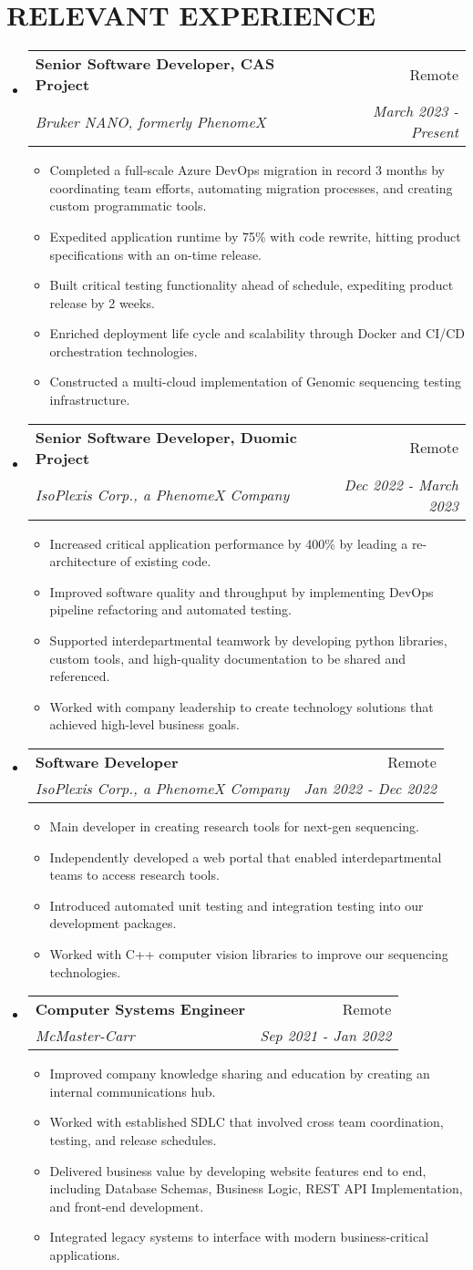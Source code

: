 \documentclass[a4paper,20pt]{article}
\makeatletter
\newcommand{\resumeItem}[2]{
  \item\small{
    \textbf{#1}{#2 \vspace{-3pt}}
  }
}
\newcommand{\resumeSubheading}[4]{
  \vspace{2pt}\item[]
    \begin{tabular*}{0.97\textwidth}{l@{\extracolsep{\fill}}r}
      \textbf{#1} & #2 \\
      \textit{#3} & \textit{#4} \\
    \end{tabular*}\vspace{-2pt}
}
\newcommand{\resumeSubHeadingListStart}{\begin{itemize}[leftmargin=*]}
\newcommand{\resumeSubHeadingListEnd}{\end{itemize}}
\newcommand{\resumeItemListStart}{\begin{itemize}}
\newcommand{\resumeItemListEnd}{\end{itemize}\vspace{-5pt}}
\makeatother
\begin{document}
\section{\textbf{RELEVANT EXPERIENCE}}
  \resumeSubHeadingListStart
  \resumeSubheading{Senior Software Developer, CAS Project}{Remote}
    {Bruker NANO, formerly PhenomeX}{March 2023 - Present}
    \resumeItemListStart
          \resumeItem{}{Completed a full-scale Azure DevOps migration in record 3 months by coordinating team efforts, automating migration processes, and creating custom programmatic tools.}
          \resumeItem{}{Expedited application runtime by 75\% with code rewrite, hitting product specifications with an on-time release.}
          \resumeItem{}{Built critical testing functionality ahead of schedule, expediting product release by 2 weeks.}
          \resumeItem{}{Enriched deployment life cycle and scalability through Docker and CI/CD orchestration technologies.}
          \resumeItem{}{Constructed a multi-cloud implementation of Genomic sequencing testing infrastructure.}
      \resumeItemListEnd
    \resumeSubheading{Senior Software Developer, Duomic Project}{Remote}
    {IsoPlexis Corp., a PhenomeX Company}{Dec 2022 - March 2023}
    \resumeItemListStart
          \resumeItem{}{Increased critical application performance by 400\% by leading a re-architecture of existing code.}
          \resumeItem{}{Improved software quality and throughput by implementing DevOps pipeline refactoring and automated testing.}
          \resumeItem{}{Supported interdepartmental teamwork by developing python libraries, custom tools, and high-quality documentation to be shared and referenced.}
          \resumeItem{}{Worked with company leadership to create technology solutions that achieved high-level business goals.}
      \resumeItemListEnd
    \resumeSubheading{Software Developer}{Remote}
    {IsoPlexis Corp., a PhenomeX Company}{Jan 2022 - Dec 2022}
    \resumeItemListStart
        \resumeItem{}{Main developer in creating research tools for next-gen sequencing.}
          \resumeItem{}{Independently developed a web portal that enabled interdepartmental teams to access research tools.}
          \resumeItem{}{Introduced automated unit testing and integration testing into our development packages.}
          \resumeItem{}{Worked with C++ computer vision libraries to improve our sequencing technologies.}
      \resumeItemListEnd
    \resumeSubheading
		{Computer Systems Engineer}{Remote}
		{McMaster-Carr}{Sep 2021 -  Jan 2022}
		\resumeItemListStart
        \resumeItem{}{Improved company knowledge sharing and education by creating an internal communications hub.}
          \resumeItem{}{Worked with established SDLC that involved cross team coordination, testing, and release schedules.}
          \resumeItem{}{Delivered business value by developing website features end to end, including Database Schemas, Business Logic, REST API Implementation, and front-end development.}
          \resumeItem{}{Integrated legacy systems to interface with modern business-critical applications.}
		\resumeItemListEnd
\resumeSubHeadingListEnd
\vspace{6pt}
\end{document}
